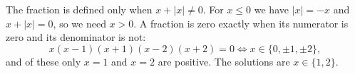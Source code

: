 The fraction is defined only when $x+|x|\ne0$. For $x\le0$ we have $|x|=-x$ and $x+|x|=0$, so we need $x>0$. A fraction is zero exactly when its numerator is zero and its denominator is not:
\[
x(x-1)(x+1)(x-2)(x+2)=0\iff x\in\{0,\pm1,\pm2\},
\]
and of these only $x=1$ and $x=2$ are positive. The solutions are $x\in\boxed{\{1,2\}}$.
